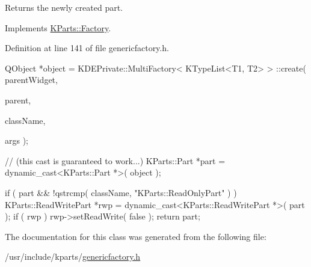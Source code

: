 \begin{DoxyReturn}{\-Returns}
the newly created part. 
\end{DoxyReturn}


\-Implements \hyperlink{classKParts_1_1Factory_a05e336b747b65776e31db466736570f2}{\-K\-Parts\-::\-Factory}.



\-Definition at line 141 of file genericfactory.\-h.


\begin{DoxyCode}
        {
            QObject *object = KDEPrivate::MultiFactory< KTypeList<T1, T2> >
      ::create( parentWidget,
                                                                               
            parent,
                                                                               
            className,
                                                                               
            args );

            // (this cast is guaranteed to work...)
            KParts::Part *part = dynamic_cast<KParts::Part *>( object );

            if ( part && !qstrcmp( className, "KParts::ReadOnlyPart" ) )
            {
                KParts::ReadWritePart *rwp = dynamic_cast<KParts::ReadWritePart
       *>( part );
                if ( rwp )
                    rwp->setReadWrite( false );
            }
            return part;
        }
\end{DoxyCode}


\-The documentation for this class was generated from the following file\-:\begin{DoxyCompactItemize}
\item 
/usr/include/kparts/\hyperlink{genericfactory_8h}{genericfactory.\-h}\end{DoxyCompactItemize}
